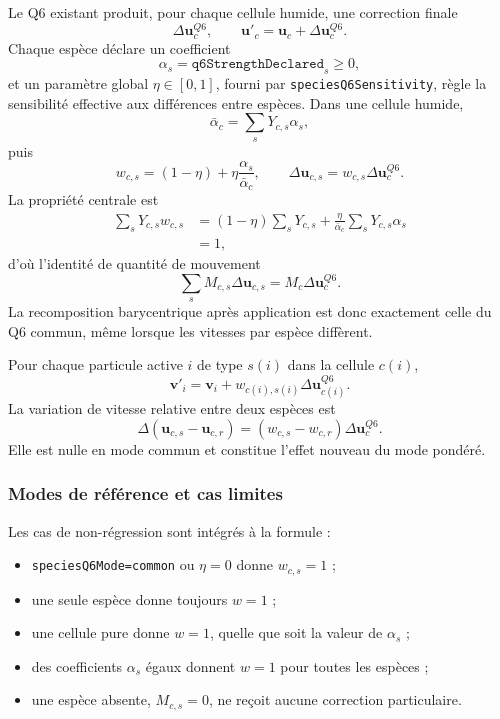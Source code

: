 \documentclass[11pt,a4paper]{article}
\begin{document}
Le Q6 existant produit, pour chaque cellule humide, une correction finale
\begin{equation}
  \Delta\bm{u}^{Q6}_c,
  \qquad
  \bm{u}'_c=\bm{u}_c+\Delta\bm{u}^{Q6}_c.
\end{equation}
Chaque espèce déclare un coefficient
\begin{equation}
  \alpha_s=\texttt{q6StrengthDeclared}_s\ge0,
\end{equation}
et un paramètre global $\eta\in[0,1]$, fourni par \texttt{speciesQ6Sensitivity}, règle la sensibilité effective aux différences entre espèces. Dans une cellule humide,
\begin{equation}
  \bar\alpha_c=\sum_sY_{c,s}\alpha_s,
\end{equation}
puis
\begin{equation}
  w_{c,s}=(1-\eta)+\eta\frac{\alpha_s}{\bar\alpha_c},
  \qquad
  \Delta\bm{u}_{c,s}=w_{c,s}\Delta\bm{u}^{Q6}_c.
\end{equation}
La propriété centrale est
\begin{align}
  \sum_sY_{c,s}w_{c,s}
  &=(1-\eta)\sum_sY_{c,s}
  +\frac{\eta}{\bar\alpha_c}\sum_sY_{c,s}\alpha_s\\
  &=1,
\end{align}
d'où l'identité de quantité de mouvement
\begin{equation}
  \sum_sM_{c,s}\Delta\bm{u}_{c,s}
  =M_c\Delta\bm{u}^{Q6}_c.
\end{equation}
La recomposition barycentrique après application est donc exactement celle du Q6 commun, même lorsque les vitesses par espèce diffèrent.

Pour chaque particule active $i$ de type $s(i)$ dans la cellule $c(i)$,
\begin{equation}
  \bm{v}'_i
  =\bm{v}_i+w_{c(i),s(i)}\Delta\bm{u}^{Q6}_{c(i)}.
\end{equation}
La variation de vitesse relative entre deux espèces est
\begin{equation}
  \Delta(\bm{u}_{c,s}-\bm{u}_{c,r})
  =(w_{c,s}-w_{c,r})\Delta\bm{u}^{Q6}_c.
\end{equation}
Elle est nulle en mode commun et constitue l'effet nouveau du mode pondéré.

\subsubsection{Modes de référence et cas limites}

Les cas de non-régression sont intégrés à la formule :
\begin{itemize}[nosep]
  \item \texttt{speciesQ6Mode=common} ou $\eta=0$ donne $w_{c,s}=1$ ;
  \item une seule espèce donne toujours $w=1$ ;
  \item une cellule pure donne $w=1$, quelle que soit la valeur de $\alpha_s$ ;
  \item des coefficients $\alpha_s$ égaux donnent $w=1$ pour toutes les espèces ;
  \item une espèce absente, $M_{c,s}=0$, ne reçoit aucune correction particulaire.
\end{itemize}
\end{document}
